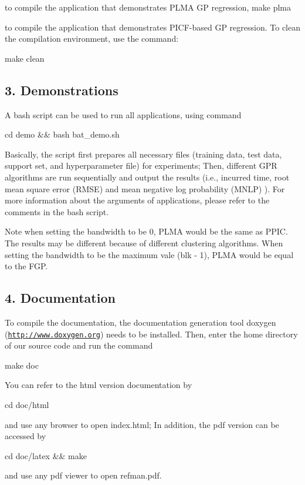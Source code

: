 to compile the application that demonstrates P\+L\+M\+A G\+P regression, make plma

to compile the application that demonstrates P\+I\+C\+F-\/based G\+P regression. To clean the compilation environment, use the command\+: \begin{DoxyVerb}make clean
\end{DoxyVerb}


\subsection*{3. Demonstrations }

A bash script can be used to run all applications, using command \begin{DoxyVerb}cd demo && bash bat_demo.sh
\end{DoxyVerb}


Basically, the script first prepares all necessary files (training data, test data, support set, and hyperparameter file) for experiments; Then, different G\+P\+R algorithms are run sequentially and output the results (i.\+e., incurred time, root mean square error (R\+M\+S\+E) and mean negative log probability (M\+N\+L\+P) ). For more information about the arguments of applications, please refer to the comments in the bash script.

Note when setting the bandwidth to be 0, P\+L\+M\+A would be the same as P\+P\+I\+C. The results may be different because of different clustering algorithms. When setting the bandwidth to be the maximum vale (blk -\/ 1), P\+L\+M\+A would be equal to the F\+G\+P.

\subsection*{4. Documentation }

To compile the documentation, the documentation generation tool doxygen (\href{http://www.doxygen.org}{\tt http\+://www.\+doxygen.\+org}) needs to be installed. Then, enter the home directory of our source code and run the command \begin{DoxyVerb}make doc
\end{DoxyVerb}


You can refer to the html version documentation by \begin{DoxyVerb}cd doc/html 
\end{DoxyVerb}


and use any browser to open index.\+html; In addition, the pdf version can be accessed by \begin{DoxyVerb}cd doc/latex && make
\end{DoxyVerb}


and use any pdf viewer to open refman.\+pdf. 